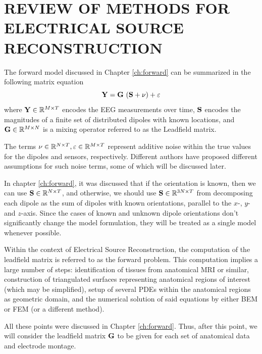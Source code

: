 \chapter{REVIEW OF METHODS FOR ELECTRICAL SOURCE RECONSTRUCTION}
\label{ch:review}



The forward model discussed in Chapter \ref{ch:forward} can be summarized in the following matrix equation
\begin{equation*}
\mathbf{Y} = \mathbf{G}\, \left(  \mathbf{S} + \nu  \right) + \varepsilon
\label{eq:general}
\end{equation*}
where $\mathbf{Y} \in \mathbb{R}^{M\times T}$ encodes the EEG measurements over time, $\mathbf{S}$ encodes the magnitudes of a finite set of distributed dipoles with known locations, and $\mathbf{G} \in \mathbb{R}^{M\times N}$ is a mixing operator referred to as the Leadfield matrix.

The terms $\nu \in \mathbb{R}^{N\times T}, \varepsilon\in\mathbb{R}^{M\times T}$ represent additive noise within the true values for the dipoles and sensors, respectively. 
%
Different authors have proposed different assumptions for such noise terms, some of which will be discussed later.

In chapter \ref{ch:forward}, it was discussed that if the orientation is known, then we can use $\mathbf{S}\in \mathbb{R}^{N\times T}$, and otherwise, we should use $\mathbf{S}\in \mathbb{R}^{3N\times T}$ from decomposing each dipole as the sum of dipoles with known orientations, parallel to the $x$-, $y$- and $z$-axis.
%
Since the cases of known and unknown dipole orientations don't significantly change the model formulation, they will be treated as a single model whenever possible.

Within the context of Electrical Source Reconstruction, the computation of the leadfield matrix is referred to as the forward problem.
%
This computation implies a large number of steps: identification of tissues from anatomical MRI or similar, construction of triangulated surfaces representing anatomical regions of interest (which may be simplified), setup of several PDEs within the anatomical regions as geometric domain, and the numerical solution of said equations by either BEM or FEM (or a different method).

All these points were discussed in Chapter \ref{ch:forward}. 
%
Thus, after this point, we will consider the leadfield matrix $\mathbf{G}$ to be given for each set of anatomical data and electrode montage.

